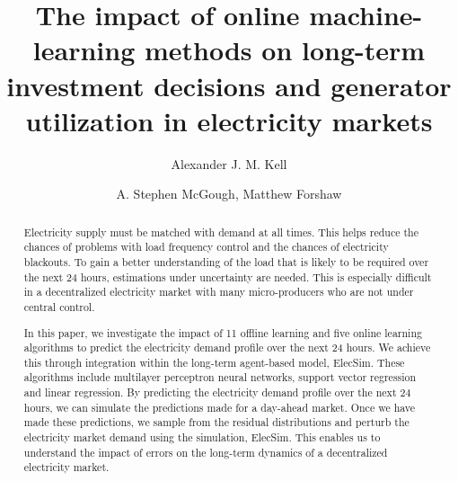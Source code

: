 \documentclass[final,3p,times,twocolumn,numbers]{elsarticle}
\begin{document}
\begin{frontmatter}


 \title{The impact of online machine-learning methods on long-term investment decisions and generator utilization in electricity markets}
 \author{Alexander J. M. Kell}



\author{A. Stephen McGough, Matthew Forshaw}

\address{School of Computing, Newcastle University, Newcastle upon Tyne, United Kingdom}

\begin{abstract}


Electricity supply must be matched with demand at all times. This helps reduce the chances of problems with load frequency control and the chances of electricity blackouts. To gain a better understanding of the load that is likely to be required over the next 24 hours, estimations under uncertainty are needed. This is especially difficult in a decentralized electricity market with many micro-producers who are not under central control. 


In this paper, we investigate the impact of 11 offline learning and five online learning algorithms to predict the electricity demand profile over the next 24 hours. We achieve this through integration within the long-term agent-based model, ElecSim. These algorithms include multilayer perceptron neural networks, support vector regression and linear regression. By predicting the electricity demand profile over the next 24 hours, we can simulate the predictions made for a day-ahead market. Once we have made these predictions, we sample from the residual distributions and perturb the electricity market demand using the simulation, ElecSim. This enables us to understand the impact of errors on the long-term dynamics of a decentralized electricity market.
 


\end{abstract}
\end{frontmatter}
\end{document}
